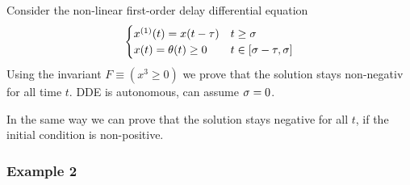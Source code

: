 \documentclass[10pt]{report}
\begin{document}
            Consider the non-linear first-order delay differential equation
            \begin{equation}
                \begin{cases}
                    \D{x}(t) = x(t-\tau) & t \geq \tzero\\
                    x(t) = \theta(t)\geq 0 & t \in [\tzero-\tau,\tzero]
                \end{cases}
            \end{equation}
            Using the invariant $F\equiv(x^3\geq 0)$ we prove that the solution stays non-negativ for all time $t$.
            DDE is autonomous, can assume $\sigma=0$.
            \footnotesize
            \begin{sequentdeduction}
            \end{sequentdeduction}\normalsize
            In the same way we can prove that the solution stays negative for all $t$, if the initial condition is non-positive.

        \subsubsection{Example 2}
            \label{sec:ddi-example-2}
\end{document}
